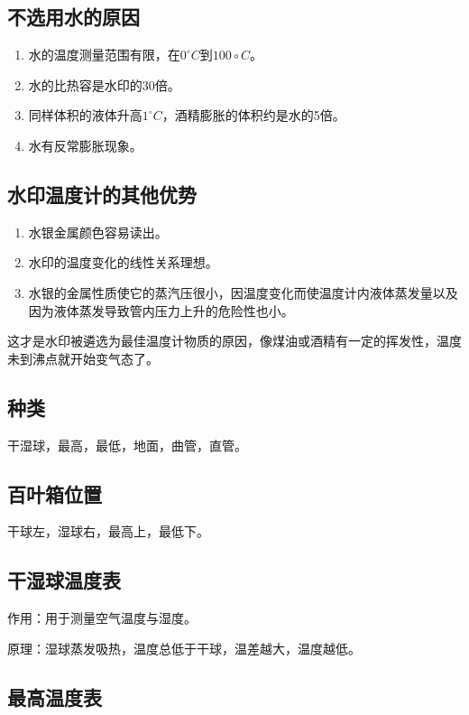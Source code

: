 \documentclass[UTF8,11pt]{ctexbook}
\begin{document}
\subsection{不选用水的原因}
\begin{enumerate}
    \item 水的温度测量范围有限，在\(0^\circ C\)到\(100\circ C\)。
    \item 水的比热容是水印的30倍。
    \item 同样体积的液体升高\(1^\circ C\)，酒精膨胀的体积约是水的5倍。
    \item 水有反常膨胀现象。
\end{enumerate}

\subsection{水印温度计的其他优势}
\begin{enumerate}
    \item 水银金属颜色容易读出。
    \item 水印的温度变化的线性关系理想。
    \item 水银的金属性质使它的蒸汽压很小，因温度变化而使温度计内液体蒸发量以及因为液体蒸发导致管内压力上升的危险性也小。
\end{enumerate}

这才是水印被遴选为最佳温度计物质的原因，像煤油或酒精有一定的挥发性，温度未到沸点就开始变气态了。

\subsection{种类}

干湿球，最高，最低，地面，曲管，直管。

\subsection{百叶箱位置}

干球左，湿球右，最高上，最低下。

\subsection{干湿球温度表}

作用：用于测量空气温度与湿度。

原理：湿球蒸发吸热，温度总低于干球，温差越大，温度越低。

\subsection{最高温度表}
\end{document}
